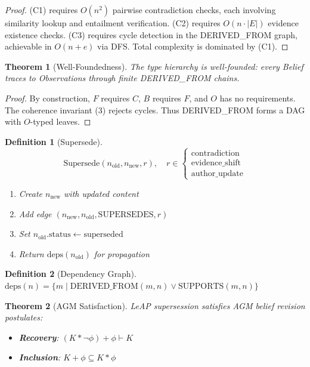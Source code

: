 \documentclass[11pt,letterpaper]{article}
\newtheorem{definition}{Definition}[section]
\newtheorem{theorem}{Theorem}[section]
\begin{document}
\begin{proof}
(C1) requires $O(n^2)$ pairwise contradiction checks, each involving similarity lookup and entailment verification. (C2) requires $O(n \cdot |E|)$ evidence existence checks. (C3) requires cycle detection in the DERIVED\_FROM graph, achievable in $O(n + e)$ via DFS. Total complexity is dominated by (C1).
\end{proof}

\begin{theorem}[Well-Foundedness]
\label{thm:wellfounded}
The type hierarchy is well-founded: every Belief traces to Observations through finite DERIVED\_FROM chains.
\end{theorem}

\begin{proof}
By construction, $F$ requires $C$, $B$ requires $F$, and $O$ has no requirements. The coherence invariant (3) rejects cycles. Thus DERIVED\_FROM forms a DAG with $O$-typed leaves.
\end{proof}

\begin{definition}[Supersede]
\[
\text{Supersede}(n_{\text{old}}, n_{\text{new}}, r),
\quad
r \in
\begin{cases}
\text{contradiction}\\
\text{evidence\_shift}\\
\text{author\_update}
\end{cases}
\]
\begin{enumerate}[noitemsep]
    \item Create $n_{\text{new}}$ with updated content
    \item Add edge $(n_{\text{new}}, n_{\text{old}}, \text{SUPERSEDES}, r)$
    \item Set $n_{\text{old}}.\text{status} \gets \text{superseded}$
    \item Return $\text{deps}(n_{\text{old}})$ for propagation
\end{enumerate}
\end{definition}


\begin{definition}[Dependency Graph]
\label{def:deps}
$\text{deps}(n) = \{m \mid \text{DERIVED\_FROM}(m, n) \vee \text{SUPPORTS}(m, n)\}$
\end{definition}

\begin{theorem}[AGM Satisfaction]
\label{thm:agm}
LeAP supersession satisfies AGM belief revision postulates:
\begin{itemize}[noitemsep]
    \item \textbf{Recovery}: $(K * \neg\phi) + \phi \vdash K$
    \item \textbf{Inclusion}: $K + \phi \subseteq K * \phi$
\end{itemize}
\end{theorem}
\end{document}
